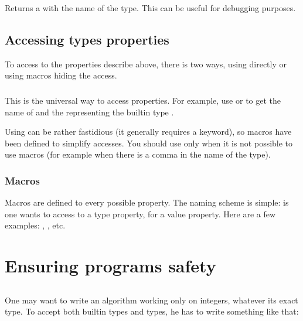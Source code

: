 Returns a  with the name of the type. This can be useful
for debugging purposes.

\subsection{Accessing types properties}

To access to the properties describe above, there is two ways, using
directly  or using macros hiding the access.

\subsubsection{}

This is the universal way to access properties. For example, use
 or 
 to get the name of 
 and the  representing the builtin 
type .

Using  can be rather fastidious (it generally
requires a  keyword), so macros have been defined to
simplify accesses. You should use  only when it is
not possible to use macros (for example when there is a comma in the
name of the type).

\subsubsection{Macros}

Macros are defined to every possible property. The naming scheme is
simple:  is one wants to access to a
type property,  for a value property. Here are
a few examples: ,
, etc.

\section{Ensuring programs safety}

\subsection{}

One may want to write an algorithm working only on integers, whatever
its exact type. To accept both builtin types and {\integre} types, he
has to write something like that:

